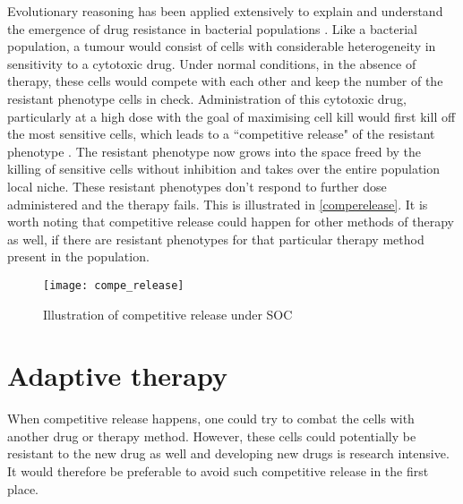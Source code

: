 Evolutionary reasoning has been applied extensively to explain and understand the emergence of drug resistance in bacterial populations \cite{Davies}. Like a bacterial population, a tumour would consist of cells with considerable heterogeneity in sensitivity to a cytotoxic drug. Under normal conditions, in the absence of therapy, these cells would compete with each other and keep the number of the resistant phenotype cells in check. Administration of this cytotoxic drug, particularly at a high dose with the goal of maximising cell kill would first kill off the most sensitive cells, which leads to a ``competitive release" of the resistant phenotype \cite{Scott}. The resistant phenotype now grows into the space freed by the killing of sensitive cells without inhibition and takes over the entire population local niche. These resistant phenotypes don’t respond to further dose administered and the therapy fails. This is illustrated in \autoref{comperelease}. It is worth noting that competitive release could happen for other methods of therapy as well, if there are resistant phenotypes for that particular therapy method present in the population.

\begin{figure}[h]
  \centering
  \texttt{[image: compe\_release]}
  \caption{Illustration of competitive release under SOC}
  \label{comperelease}
\end{figure}

\section{Adaptive therapy}
When competitive release happens, one could try to combat the cells with another drug or therapy method. However, these cells could potentially be resistant to the new drug as well and developing new drugs is research intensive. It would therefore be preferable to avoid such competitive release in the first place.

